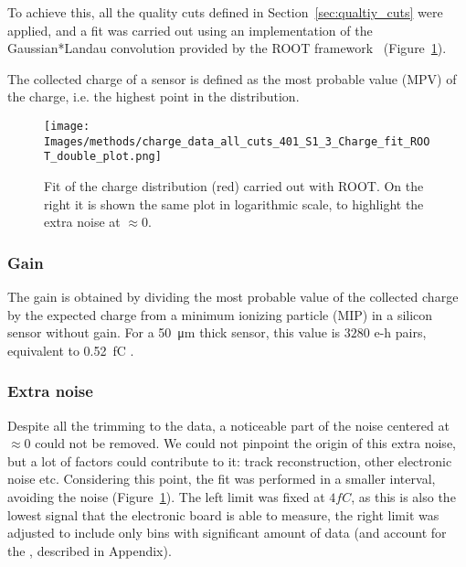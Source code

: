 To achieve this, all the quality cuts defined in Section~\ref{sec:qualtiy_cuts} were applied, and a fit was carried out using an implementation of the Gaussian*Landau convolution provided by the ROOT framework~\cite{Brun:1997pa} (Figure~\ref{fig:charge_ROOT_fit}).

The collected charge of a sensor is defined as the most probable value (MPV) of the charge, i.e. the highest point in the distribution.

\begin{figure}[h!tbp]
    \centering
    \texttt{[image: Images/methods/charge\_data\_all\_cuts\_401\_S1\_3\_Charge\_fit\_ROOT\_double\_plot.png]}
    \captionsetup{width=\captionwidth}
    \caption{Fit of the charge distribution (red) carried out with ROOT. On the right it is shown the same plot in logarithmic scale, to highlight the extra noise at \(\approx 0\).}
    \label{fig:charge_ROOT_fit}
\end{figure}

\subsubsection{Gain}
The gain is obtained by dividing the most probable value of the collected charge by the expected charge from a minimum ionizing particle (MIP) in a silicon sensor without gain. For a \qty{50}{\micro\meter} thick sensor, this value is \(3280\) e-h pairs, equivalent to \qty{.52}{\femto\coulomb} \cite{meroli_energy_loss2011}.

\subsubsection{Extra noise}
Despite all the trimming to the data, a noticeable part of the noise centered at \(\approx 0\) could not be removed. We could not pinpoint the origin of this extra noise, but a lot of factors could contribute to it: track reconstruction, other electronic noise etc.
Considering this point, the fit was performed in a smaller interval, avoiding the noise (Figure~\ref{fig:charge_ROOT_fit}). The left limit was fixed at \(4\si{fC}\), as this is also the lowest signal that the electronic board is able to measure, the right limit was adjusted to include only bins with significant amount of data (and account for the , described in Appendix).



